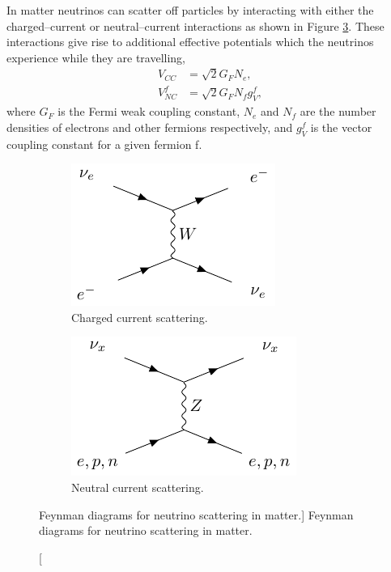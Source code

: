 In matter neutrinos can scatter off particles by interacting with either
the charged--current or neutral--current interactions as shown in Figure
\ref{fig:nu_in_matter}. These interactions give rise to additional effective
potentials which the neutrinos experience while they are travelling,
\begin{align}
	V_{CC} &= \sqrt{2} G_F N_e, \\
	V_{NC}^f &= \sqrt{2} G_F N_f g_V^f,
\end{align}
where $G_F$ is the Fermi weak coupling constant, $N_e$ and $N_f$ are the number
densities of electrons and other fermions respectively, and $g_V^f$ is the
vector coupling constant for a given fermion f.
\begin{figure}
	\centering

	\begin{subfigure}[b]{0.49\textwidth}
		\includegraphics[width=\textwidth]{latex_extras/ne_cc.pdf}
		\caption{Charged current scattering.}
		\label{fig:nu_cc}
	\end{subfigure}
	\hfill
	\begin{subfigure}[b]{0.49\textwidth}
		\includegraphics[width=\textwidth]{latex_extras/n_nc.pdf}
		\caption{Neutral current scattering.}
		\label{fig:nu_nc}
	\end{subfigure}

	\caption
	[Feynman diagrams for neutrino scattering in matter.]
	{Feynman diagrams for neutrino scattering in matter.}

	\label{fig:nu_in_matter}
\end{figure}

